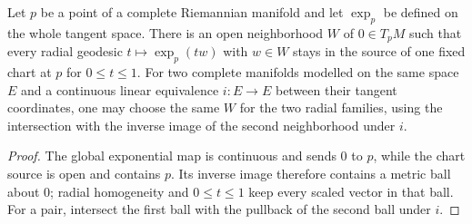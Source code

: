 \begin{lemma}
  \label{lem:dc-ch8-2-1-radial-chart}


  Let $p$ be a point of a complete Riemannian manifold and let $\exp_p$ be defined on the
  whole tangent space. There is an open neighborhood $W$ of $0\in T_pM$ such that every
  radial geodesic $t\mapsto\exp_p(tw)$ with $w\in W$ stays in the source of one fixed chart
  at $p$ for $0\leq t\leq1$. For two complete manifolds modelled on the same space $E$ and a
  continuous linear equivalence $i:E\to E$ between their tangent coordinates, one may choose
  the same $W$ for the two radial families, using the intersection with the inverse image of the
  second neighborhood under $i$.
\end{lemma}
\begin{proof}

  The global exponential map is continuous and sends $0$ to $p$, while the chart source is
  open and contains $p$. Its inverse image therefore contains a metric ball about $0$; radial
  homogeneity and $0\leq t\leq1$ keep every scaled vector in that ball. For a pair, intersect
  the first ball with the pullback of the second ball under $i$.
\end{proof}

